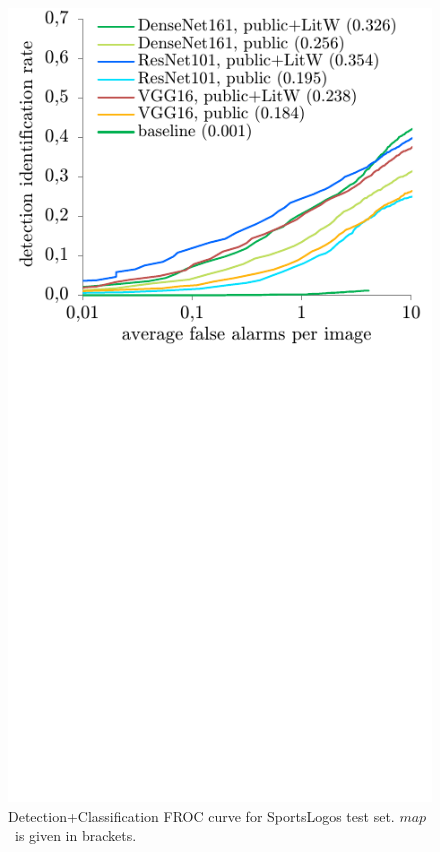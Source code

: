 \documentclass[a4paper,twoside]{article}
\newcommand{\sizebox}[2]{\parbox{#1}{\centering #2}}
\newcommand{\map}{$\mathit{map}$}
\begin{document}
%
\begin{figure}%
\centering%
\includegraphics[width=\linewidth, trim=0cm 8cm 0cm 0cm, clip]{img/classificationFrocFootball.pdf}%
\caption{Detection+Classification FROC curve for SportsLogos test set. \map~is given in brackets.}%
\label{fig:classificationFrocFootball}
\end{figure}%
\end{document}
